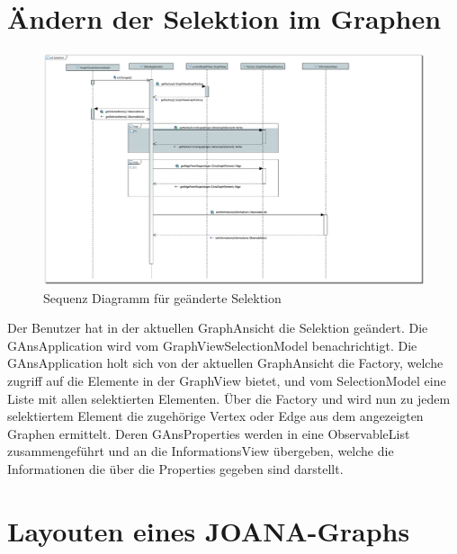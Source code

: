 \newpage

\section{Ändern der Selektion im Graphen}

\begin{figure}[!htbp]
	\centering
	\includegraphics[width=450pt]{resourcen/SeqDiagramSelection.PDF}
	\caption{Sequenz Diagramm für geänderte Selektion}
	\label{fig:seq:selection}
\end{figure}

Der Benutzer hat in der aktuellen GraphAnsicht die Selektion geändert. Die GAnsApplication wird vom GraphViewSelectionModel benachrichtigt. Die GAnsApplication holt sich von der aktuellen GraphAnsicht die Factory, welche zugriff auf die Elemente in der GraphView bietet, und vom SelectionModel eine Liste mit allen selektierten Elementen. Über die Factory und wird nun zu jedem selektiertem Element die zugehörige Vertex oder Edge aus dem angezeigten Graphen ermittelt. Deren GAnsProperties werden in eine ObservableList zusammengeführt und an die InformationsView übergeben, welche die Informationen die über die Properties gegeben sind darstellt.

\newpage

\section{Layouten eines JOANA-Graphs}

